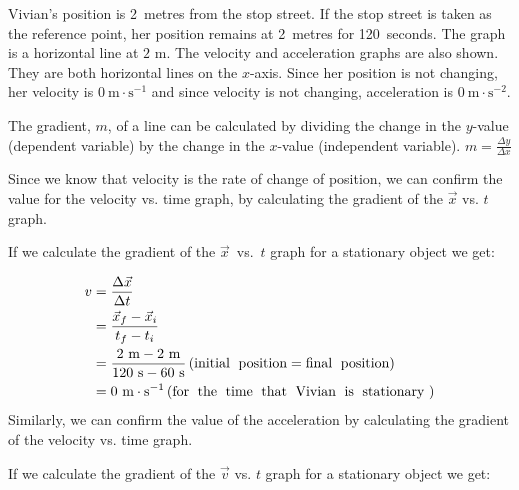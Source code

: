 Vivian's position is 2~metres from the stop street. If the stop street is taken as the reference point, her position remains at 2~metres for 120~seconds. The graph is a horizontal line at $2 \text{ m}$.
The velocity and acceleration graphs are also shown. They are both horizontal lines on the $x$-axis. Since her position is not changing, her velocity is $0~\text{m}\ensuremath{\cdot}\text{s}{}^{-1}$ and since velocity is not changing, acceleration is $0~\text{m}\ensuremath{\cdot}\text{s}{}^{-2}$.\par 


\par
{} {The gradient, $m$, of a line can be calculated by dividing the change in the $y$-value (dependent variable) by the change in the $x$-value (independent variable). $m = \frac{\Delta y}{\Delta x}$ \par  } 
        \label{m38795*id69281}Since we know that velocity is the rate of change of position, we can confirm the value for the velocity vs. time graph, by calculating the gradient of the $\vec{x}$ vs. $t$ graph.\par 
\label{m38795*notfhsst!!!underscore!!!id1870}
	\par
        \label{m38795*id69310}If we calculate the gradient of the $\vec{x}$~vs.~$t$ graph for a stationary object we get:\par 
        \label{m38795*id69332}\nopagebreak\noindent{}
    \begin{align*}
	v &= \frac{\Delta \vec{x}}{\Delta t}\\
	&= \frac{\vec{x}_{f}-\vec{x}_{i}}{{t}_{f}-{t}_{i}}\\
	&= \frac{2~\text{m}-2~\text{m}}{120~\text{s}-60~\text{s}} \left(\text{initial\; position}=\text{final\; position}\right)\\ 
	&= 0~\text{m}\ensuremath{\cdot}{\text{s}}^{-1}  \left(\text{for\; the\; time\; that\; Vivian\; is\; stationary}~\right) \\
      \end{align*}
        \label{m38795*id69558}Similarly, we can confirm the value of the acceleration by calculating the gradient of the velocity vs. time graph.\par 
\label{m38795*notfhsst!!!underscore!!!id2005}
	\par
        \label{m38795*id69571}If we calculate the gradient of the $\vec{v}$ vs. $t$ graph for a stationary object we get:\par 
          
